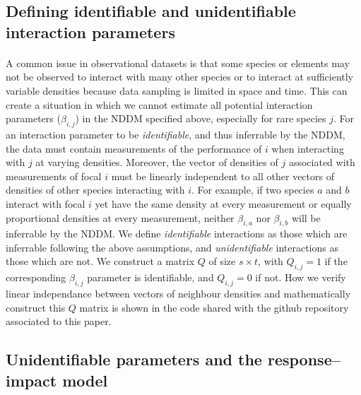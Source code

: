 \documentclass[a4,12pt]{article}
\begin{document}
    \subsection{Defining identifiable and unidentifiable interaction parameters}
    \label{meth:id_params}

    \paragraph{}
    A common issue in observational datasets is that some species or elements may not be observed to interact with many other species or to interact at sufficiently variable densities because data sampling is limited in space and time. This can create a situation in which we cannot estimate all potential interaction parameters ($\beta_{i,j}$) in the NDDM specified above, especially for rare species $j$. For an interaction parameter to be \textit{identifiable}, and thus inferrable by the NDDM, the data must contain measurements of the performance of $i$ when interacting with $j$ at varying densities. Moreover, the vector of densities of $j$ associated with measurements of focal $i$ must be linearly independent to all other vectors of densities of other species interacting with $i$. For example, if two species $a$ and $b$ interact with focal $i$ yet have the same density at every measurement or equally proportional densities at every measurement, neither $\beta_{i, a}$ nor $\beta_{i, b}$ will be inferrable by the NDDM. We define \textit{identifiable} interactions as those which are inferrable following the above assumptions, and \textit{unidentifiable} interactions as those which are not. We construct a matrix $Q$ of size $s \times t$, with $Q_{i, j} = 1$ if the corresponding $\beta_{i, j}$ parameter is identifiable, and $Q_{i, j} = 0$ if not. How we verify linear independance between vectors of neighbour densities and mathematically construct this $Q$ matrix is shown in the code shared with the github repository associated to this paper.
    
    \subsection{Unidentifiable parameters and the response--impact model}
    \label{meth:rim}
\end{document}

